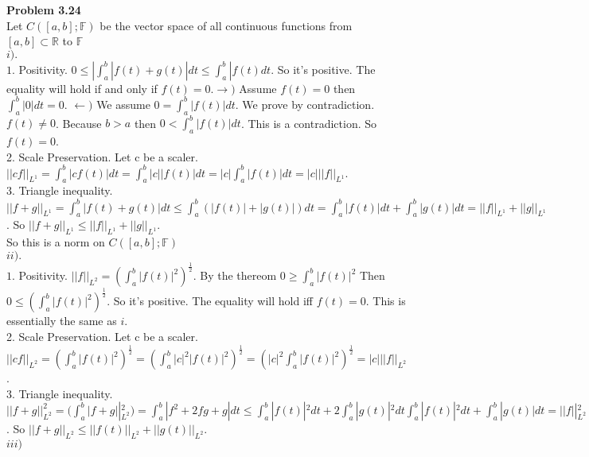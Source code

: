 \documentclass[letterpaper,12pt]{article}
\theoremstyle{definition}
\begin{document}
\noindent\textbf{Problem 3.24}\\
\noindent Let $C([a, b]; \mathbb{F} )$ be the vector space of all continuous functions from $[a, b] \subset \mathbb{R}$ to $ \mathbb{F}$\\
 $i). $\\
 $1.$ Positivity.  $0 \leq |\int_a^b|f(t) +g(t)|dt \leq \int_a^b |f(t)dt$. So it's positive.  The equality will hold if and only if $f(t)=0.  \rightarrow)$ Assume $f(t)=0$ then $\int_a^b|0|dt = 0$. $\leftarrow)$ We assume $0=\int_a^b|f(t)|dt$.  We prove by contradiction. $f(t) \neq 0$.  Because $b>a$ then $0 < \int_a^b|f(t)|dt$.  This is a contradiction.  So $f(t) = 0$.\\
 2. Scale Preservation.  Let c be a scaler. $||cf||_{L^1}=\int_a^b|cf(t)|dt = \int_a^b|c||f(t)|dt = |c|\int_a^b|f(t)|dt = |c|||f||_{L^1} $.  \\
 3. Triangle inequality.  $||f + g||_{L^1} = \int_a^b |f(t) + g(t)|dt \leq \int_a^b(|f(t)| + |g(t)|)dt = \int_a^b|f(t)|dt + \int_a^b|g(t)|dt = ||f||_{L^1} + ||g||_{L^1}$.  So $||f + g||_{L^1} \leq ||f||_{L^1} + ||g||_{L^1}$.  \\
 So this is a norm on $C([a, b];\mathbb{F})$\\
\vspace{3mm}
 $ii).$\\
 $ 1.$ Positivity.  $||f||_{L^2} = (\int_a^b|f(t)|^2)^{\frac{1}{2}}$.  By the thereom $0 \geq \int_a^b|f(t)|^2$ Then $0 \leq (\int_a^b|f(t)|^2)^{\frac{1}{2}}$.  So it's positive.  The equality will hold iff $f(t)=0$.  This is essentially the same as $i$.\\
 2. Scale Preservation. Let c be a scaler.  $||cf||_{L^2} = (\int_a^b|f(t)|^2)^{\frac{1}{2}} = (\int_a^b|c|^2|f(t)|^2)^{\frac{1}{2}} = (|c|^2 \int_a^b |f(t)|^2)^{\frac{1}{2}} = |c|||f||_{L^2}$.\\
 3. Triangle inequality.  $||f + g||^2_{L^2} = (\int_a^b|f+g||^2_{L^2}) = \int_a^b |f^2+2fg+g|dt \leq \int_a^b|f(t)|^2dt + 2\int_a^b|g(t)|^2 dt \int_a^b |f(t)|^2 dt + \int_a^b|g(t)|dt = ||f||^2_{L^2} + 2||f||_{L^2}||g||_{L^2} +  ||g||^2_{L^2} = (||f(t)|| + ||g(t)||)^2$.  So $||f + g||_{L^2} \leq ||f(t)||_{L^2} + ||g(t)||_{L^2}$. \\
 $iii)$\\
 \vspace{3mm}
\end{document}
